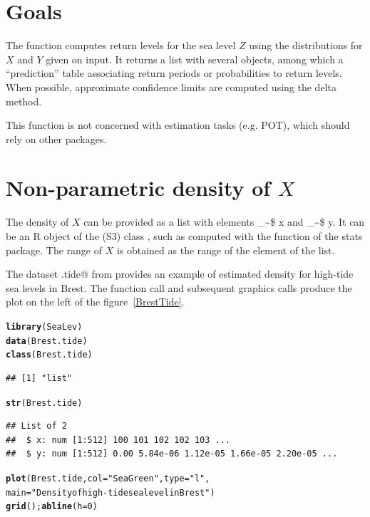 \documentclass[11pt,a4paper]{report}\usepackage[]{graphicx}\usepackage[]{color}
\makeatletter
\newcommand{\hlnum}[1]{\textcolor[rgb]{0.686,0.059,0.569}{#1}}%
\newcommand{\hlstr}[1]{\textcolor[rgb]{0.192,0.494,0.8}{#1}}%
\newcommand{\hlstd}[1]{\textcolor[rgb]{0.345,0.345,0.345}{#1}}%
\newcommand{\hlkwc}[1]{\textcolor[rgb]{0.333,0.667,0.333}{#1}}%
\newcommand{\hlkwd}[1]{\textcolor[rgb]{0.737,0.353,0.396}{\textbf{#1}}}%
\newenvironment{kframe}{%
 \def\at@end@of@kframe{}%
 \ifinner\ifhmode%
  \def\at@end@of@kframe{\end{minipage}}%
  \begin{minipage}{\columnwidth}%
 \fi\fi%
 \def\FrameCommand##1{\hskip\@totalleftmargin \hskip-\fboxsep
 \colorbox{shadecolor}{##1}\hskip-\fboxsep
     \hskip-\linewidth \hskip-\@totalleftmargin \hskip\columnwidth}%
 \MakeFramed {\advance\hsize-\width
   \@totalleftmargin\z@ \linewidth\hsize
   \@setminipage}}%
 {\par\unskip\endMakeFramed%
 \at@end@of@kframe}
\newenvironment{knitrout}{}{} %
\newcommand\code{\bgroup\@makeother\_\@makeother\~\@makeother\$\@codex}
\def\@codex#1{{\normalfont\ttfamily\hyphenchar\font=-1 #1}\egroup}
\newcommand{\pkg}[1]{{\fontseries{b}\selectfont #1}}
\makeatother
\begin{document}
\section{Goals}
The \verb@convSL@ function computes return levels for the sea level
$Z$ using the distributions for $X$ and $Y$ given on input.  It
returns a list with several objects, among which a ``prediction'' table
associating return periods or probabilities to return levels. When
possible, approximate confidence limits are computed using the delta
method.

This function is not concerned with estimation tasks (e.g. POT), which should
rely on other packages.


\section{Non-parametric density of $X$}
The density of $X$ can be provided as a list with elements \code{x}
and \code{y}. It can be an R object of the (S3) class \verb@density@,
such as computed with the \verb@density@ function of the \pkg{stats}
package. The range of $X$ is obtained as the range of the \verb@x@
element of the list.

The dataset \verb@Brest.tide@ from \verb@SeaLev@ provides
an example of estimated density for high-tide sea levels in Brest.
The \verb@plot@ function call and subsequent graphics calls produce the
plot on the left of the figure~\ref{BrestTide}.

\begin{knitrout}
\color{fgcolor}\begin{kframe}
\begin{alltt}
\hlkwd{library}\hlstd{(SeaLev)}
\hlkwd{data}\hlstd{(Brest.tide)}
\hlkwd{class}\hlstd{(Brest.tide)}
\end{alltt}
\begin{verbatim}
## [1] "list"
\end{verbatim}
\begin{alltt}
\hlkwd{str}\hlstd{(Brest.tide)}
\end{alltt}
\begin{verbatim}
## List of 2
##  $ x: num [1:512] 100 101 102 102 103 ...
##  $ y: num [1:512] 0.00 5.84e-06 1.12e-05 1.66e-05 2.20e-05 ...
\end{verbatim}
\begin{alltt}
\hlkwd{plot}\hlstd{(Brest.tide,} \hlkwc{col} \hlstd{=} \hlstr{"SeaGreen"}\hlstd{,} \hlkwc{type} \hlstd{=} \hlstr{"l"}\hlstd{,}
     \hlkwc{main} \hlstd{=} \hlstr{"Density of high-tide sea level in Brest"}\hlstd{)}
\hlkwd{grid}\hlstd{();} \hlkwd{abline}\hlstd{(}\hlkwc{h} \hlstd{=} \hlnum{0}\hlstd{)}
\end{alltt}
\end{kframe}
\end{knitrout}
\end{document}
